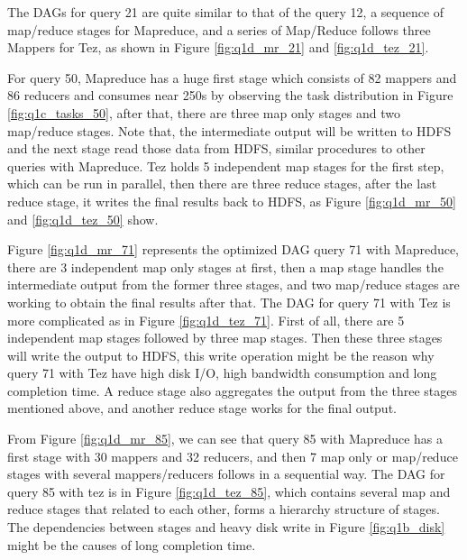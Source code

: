 \documentclass[10pt]{article}
\begin{document}
The DAGs for query 21 are quite similar to that of the query 12, a sequence of map/reduce stages for Mapreduce, and a series of Map/Reduce follows three Mappers for Tez, as shown in Figure \ref{fig:q1d_mr_21} and \ref{fig:q1d_tez_21}.

For query 50, Mapreduce has a huge first stage which consists of 82 mappers and 86 reducers and consumes near 250s by observing the task distribution in Figure \ref{fig:q1c_tasks_50}, after that, there are three map only stages and two map/reduce stages. Note that, the intermediate output will be written to HDFS and the next stage read those data from HDFS, similar procedures to other queries with Mapreduce. Tez holds 5 independent map stages for the first step, which can be run in parallel, then there are three reduce stages, after the last reduce stage, it writes the final results back to HDFS, as Figure \ref{fig:q1d_mr_50} and \ref{fig:q1d_tez_50} show.

Figure \ref{fig:q1d_mr_71} represents the optimized DAG query 71 with Mapreduce, there are 3 independent map only stages at first, then a map stage handles the intermediate output from the former three stages, and two map/reduce stages are working to obtain the final results after that. The DAG for query 71 with Tez is more complicated as in Figure \ref{fig:q1d_tez_71}. First of all, there are 5 independent map stages followed by three map stages. Then these three stages will write the output to HDFS, this write operation might be the reason why query 71 with Tez have high disk I/O, high bandwidth consumption and long completion time. A reduce stage also aggregates the output from the three stages mentioned above, and another reduce stage works for the final output.

From Figure \ref{fig:q1d_mr_85}, we can see that query 85 with Mapreduce has a first stage with 30 mappers and 32 reducers, and then 7 map only or map/reduce stages with several mappers/reducers follows in a sequential way. The DAG for query 85 with tez is in Figure \ref{fig:q1d_tez_85}, which contains several map and reduce stages that related to each other, forms a hierarchy structure of stages. The dependencies between stages and heavy disk write in Figure \ref{fig:q1b_disk} might be the causes of long completion time.

\end{document}
